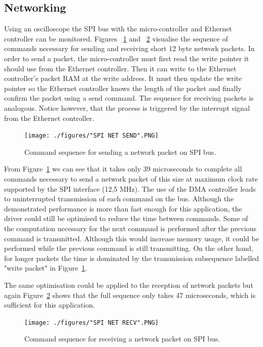 \subsection{Networking}

Using an oscilloscope the SPI bus with the micro-controller and Ethernet controller can be monitored. Figures ~\ref{fig:net_send} and ~\ref{fig:net_recv} visualise the sequence of commands necessary for sending and receiving short 12 byte network packets. In order to send a packet, the micro-controller must first read the write pointer it should use from the Ethernet controller. Then it can write to the Ethernet controller's packet RAM at the write address. It must then update the write pointer so the Ethernet controller knows the length of the packet and finally confirm the packet using a send command. The sequence for receiving packets is analogous. Notice however, that the process is triggered by the interrupt signal from the Ethernet controller.

\begin{figure}[H]
    \centering \texttt{[image: ./figures/"SPI NET SEND".PNG]}
    \caption{Command sequence for sending a network packet on SPI bus.}
    \label{fig:net_send}
\end{figure}

From Figure~\ref{fig:net_send} we can see that it takes only 39 microseconds to complete all commands necessary to send a network packet of this size at maximum clock rate supported by the SPI interface (12,5 MHz). The use of the DMA controller leads to uninterrupted transmission of each command on the bus. Although the demonstrated performance is more than fast enough for this application, the driver could still be optimised to reduce the time between commands. Some of the computation necessary for the next command is performed after the previous command is transmitted. Although this would increase memory usage, it could be performed while the previous command is still transmitting. On the other hand, for longer packets the time is dominated by the transmission subsequence labelled "write packet" in Figure~\ref{fig:net_send}.

The same optimisation could be applied to the reception of network packets but again Figure~\ref{fig:net_recv} shows that the full sequence only takes 47 microseconds, which is sufficient for this application. 

\begin{figure}[H]
    \centering \texttt{[image: ./figures/"SPI NET RECV".PNG]}
    \caption{Command sequence for receiving a network packet on SPI bus.}
    \label{fig:net_recv}
\end{figure}

